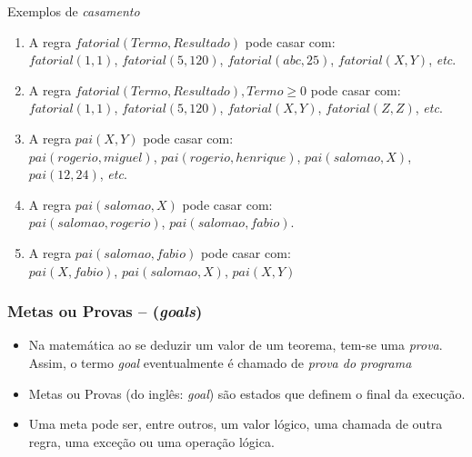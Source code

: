 
\begin{frame}[fragile]
    
\begin{block}{Exemplos de \textit{casamento}}

\begin{enumerate}
	\item A regra $fatorial(Termo, Resultado)$ pode casar com:\\
    $fatorial(1,1)$, $fatorial(5,120)$, $fatorial(abc,25)$, $fatorial(X,Y)$, \emph{etc}.
    
    \pause
     \item A regra $fatorial(Termo, Resultado), Termo \geq 0$ pode casar com:\\
    $fatorial(1,1)$, $fatorial(5,120)$, $fatorial(X,Y)$, $fatorial(Z,Z)$, \emph{etc}.
    
    \pause
    \item A regra $pai(X,Y)$ pode casar com:\\
    $pai(rogerio, miguel)$, $pai(rogerio, henrique)$, $pai(salomao, X)$, $pai(12,24)$, \emph{etc}.
    
    \pause
    \item A regra $pai(salomao, X)$ pode casar com:\\
    $pai(salomao, rogerio)$, $pai(salomao, fabio)$.
    
    \pause
    \item A regra $pai(salomao, fabio)$ pode casar com:\\
    $pai(X, fabio)$, $pai(salomao, X)$, $pai(X,Y)$
\end{enumerate}

\end{block}
    
\end{frame}


\begin{frame}[fragile]

	\frametitle{Metas ou Provas -- (\textit{goals})}
	
	\begin{itemize}
	    
	 \item Na matemática ao se deduzir um valor de um teorema, tem-se uma \textit{prova}. 
	  Assim, o termo  \textit{goal} eventualmente é chamado de \textit{prova do programa}
	 
	 \pause
	    \item Metas ou Provas (do inglês: \textit{goal}) são estados que definem o final da execução.
	    
  	 \pause
	    \item Uma meta pode ser, entre outros, um valor lógico, uma chamada de outra regra, 
	    uma exceção ou uma operação lógica.
	\end{itemize}

\end{frame}
    
